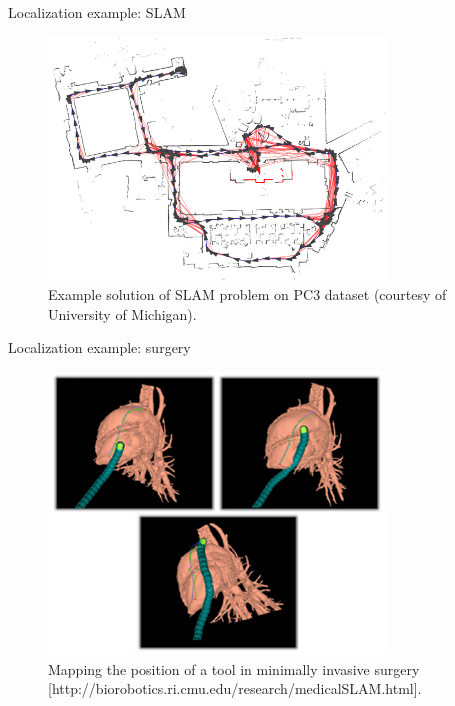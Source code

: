 \documentclass[pdftex]{beamer}
\begin{document}
\begin{frame}[noframenumbering]{Localization example: SLAM}
  \begin{figure}
  \includegraphics[width=0.8\textwidth,height=0.7\textheight,keepaspectratio]{images/slam.png}
\caption{Example solution of SLAM problem on PC3 dataset (courtesy of University of Michigan).}
\end{figure}
\end{frame}

\begin{frame}[noframenumbering]{Localization example: surgery}
  \begin{figure}
  \includegraphics[width=0.8\textwidth,height=0.7\textheight,keepaspectratio]{images/slam_surg.jpg}
\caption{Mapping the position of a tool in minimally invasive surgery [http://biorobotics.ri.cmu.edu/research/medicalSLAM.html].}
\end{figure}

\end{frame}
\end{document}
